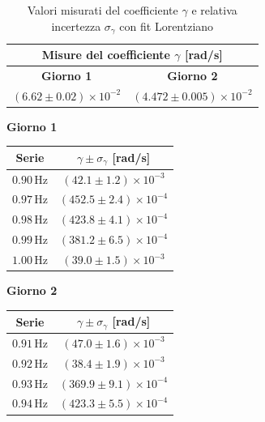 \documentclass{article}
\begin{document}
\begin{table}[h!]
\centering
\begin{tabular}{cc}
\toprule
\multicolumn{2}{c}{\textbf{Misure del coefficiente $\gamma$ [rad/s]}} \\
\midrule
\textbf{Giorno 1} & \textbf{Giorno 2} \\
\midrule
$(6.62 \pm 0.02) \times 10^{-2}$ & $(4.472 \pm 0.005) \times 10^{-2}$\\
\bottomrule
\end{tabular}
\caption{Valori misurati del coefficiente $\gamma$ e relativa incertezza $\sigma_\gamma$ con fit Lorentziano}
\label{tab:gamma_pm_lorentz}
\end{table}

\begin{table}[H]
\centering
\small %
\begin{minipage}{0.31\textwidth}
\centering
\textbf{Giorno 1}\\[0.5ex]
\begin{tabular}{cc}
\toprule
\textbf{Serie} & $\gamma \pm \sigma_\gamma$ [rad/s] \\
\midrule
$0.90\,\text{Hz}$ & $(42.1 \pm 1.2)\!\times\!10^{-3}$ \\
$0.97\,\text{Hz}$ & $(452.5 \pm 2.4)\!\times\!10^{-4}$ \\
$0.98\,\text{Hz}$ & $(423.8 \pm 4.1)\!\times\!10^{-4}$ \\
$0.99\,\text{Hz}$ & $(381.2 \pm 6.5)\!\times\!10^{-4}$ \\
$1.00\,\text{Hz}$ & $(39.0 \pm 1.5)\!\times\!10^{-3}$ \\
\bottomrule
\end{tabular}
\end{minipage}
\hfill
\begin{minipage}{0.31\textwidth}
\centering
\textbf{Giorno 2}\\[0.5ex]
\begin{tabular}{cc}
\toprule
\textbf{Serie} & $\gamma \pm \sigma_\gamma$ [rad/s] \\
\midrule
$0.91\,\text{Hz}$ & $(47.0 \pm 1.6)\!\times\!10^{-3}$ \\
$0.92\,\text{Hz}$ & $(38.4 \pm 1.9)\!\times\!10^{-3}$ \\
$0.93\,\text{Hz}$ & $(369.9 \pm 9.1)\!\times\!10^{-4}$ \\
$0.94\,\text{Hz}$ & $(423.3 \pm 5.5)\!\times\!10^{-4}$ \\

\end{tabular}
\end{minipage}
\end{table}
\end{document}
